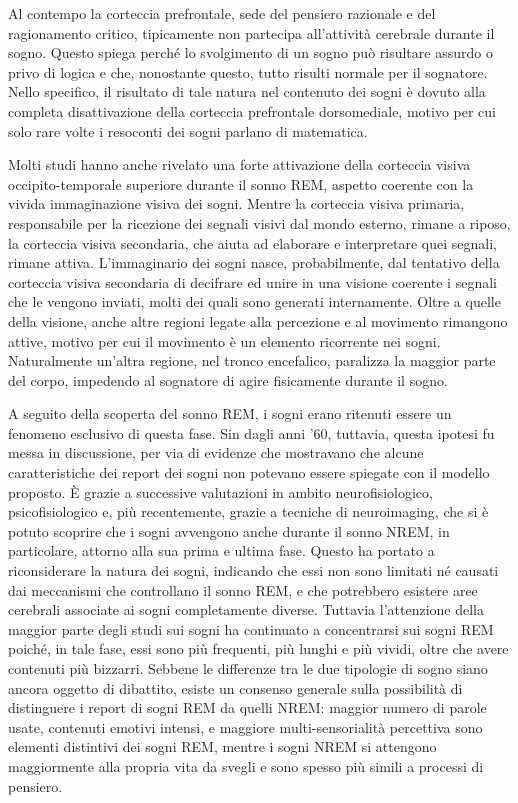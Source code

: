 Al contempo la corteccia prefrontale, sede del pensiero razionale e del ragionamento critico, tipicamente non
partecipa all'attività cerebrale durante il sogno.
Questo spiega perché lo svolgimento di un sogno può risultare assurdo o privo di logica e che, nonostante questo,
tutto risulti normale per il sognatore.
Nello specifico, il risultato di tale natura nel contenuto dei sogni è dovuto alla completa disattivazione della
corteccia prefrontale dorsomediale, motivo per cui solo rare volte i resoconti dei sogni parlano di matematica.

Molti studi hanno anche rivelato una forte attivazione della corteccia visiva occipito-temporale superiore durante
il sonno REM, aspetto coerente con la vivida immaginazione visiva dei sogni.
Mentre la corteccia visiva primaria, responsabile per la ricezione dei segnali visivi dal mondo esterno, rimane a
riposo, la corteccia visiva secondaria, che aiuta ad elaborare e interpretare quei segnali, rimane attiva.
L'immaginario dei sogni nasce, probabilmente, dal tentativo della corteccia visiva secondaria di decifrare ed unire in
una visione coerente i segnali che le vengono inviati, molti dei quali sono generati internamente.
Oltre a quelle della visione, anche altre regioni legate alla percezione e al movimento rimangono attive, motivo
per cui il movimento è un elemento ricorrente nei sogni.
Naturalmente un'altra regione, nel tronco encefalico, paralizza la maggior parte del corpo, impedendo al sognatore di
agire fisicamente durante il sogno.


A seguito della scoperta del sonno REM, i sogni erano ritenuti essere un fenomeno esclusivo di questa fase.
Sin dagli anni '60, tuttavia, questa ipotesi fu messa in discussione, per via di evidenze che mostravano che
alcune caratteristiche dei report dei sogni non potevano essere spiegate con il modello proposto.
\`E grazie a successive valutazioni in ambito neurofisiologico, psicofisiologico e, più recentemente,
grazie a tecniche di neuroimaging, che si è potuto scoprire che i sogni avvengono anche durante il sonno NREM,
in particolare, attorno alla sua prima e ultima fase. %
Questo ha portato a riconsiderare la natura dei sogni, indicando che essi non sono limitati né causati dai meccanismi
che controllano il sonno REM, e che potrebbero esistere aree cerebrali associate ai sogni completamente diverse.
Tuttavia l'attenzione della maggior parte degli studi sui sogni ha continuato a concentrarsi sui sogni REM poiché,
in tale fase, essi sono più frequenti, più lunghi e più vividi, oltre che avere contenuti più bizzarri.
Sebbene le differenze tra le due tipologie di sogno siano ancora oggetto di dibattito, esiste un consenso generale
sulla possibilità di distinguere i report di sogni REM da quelli NREM: maggior numero di parole usate,
contenuti emotivi intensi, e maggiore multi-sensorialità percettiva sono elementi distintivi dei sogni REM,
mentre i sogni NREM si attengono maggiormente alla propria vita da svegli e sono spesso più simili a
processi di pensiero.

